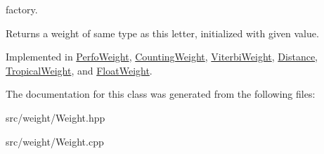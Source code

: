 factory. 

\begin{DoxyReturn}{Returns}
a weight of same type as this letter, initialized with given value. 
\end{DoxyReturn}


Implemented in \mbox{\hyperlink{classPerfoWeight_ad9237d9b3fccf6f0b70133e10c1103b2}{Perfo\+Weight}}, \mbox{\hyperlink{group__weight_ga1d225aef0e74c70d8ae73164de4f56e2}{Counting\+Weight}}, \mbox{\hyperlink{classViterbiWeight_a8b4676e41a4edb2cc5466d1e8cb1059a}{Viterbi\+Weight}}, \mbox{\hyperlink{classDistance_a1fe45f762afff378c46f81d6199a14ab}{Distance}}, \mbox{\hyperlink{classTropicalWeight_abc00c8fe56beedff6b7192325833d6d3}{Tropical\+Weight}}, and \mbox{\hyperlink{classFloatWeight_a71464c94830161af2f0dd3df99fe6856}{Float\+Weight}}.



The documentation for this class was generated from the following files\+:\begin{DoxyCompactItemize}
\item 
src/weight/Weight.\+hpp\item 
src/weight/Weight.\+cpp\end{DoxyCompactItemize}
